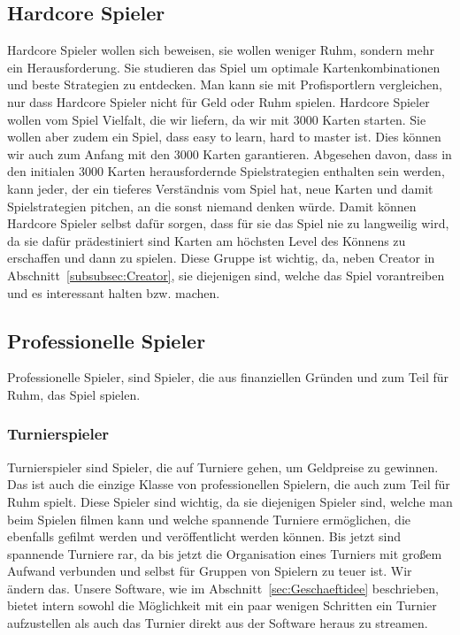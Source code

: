 \documentclass[fontsize=12, a4aper]{scrartcl}
\begin{document}
\subsection{Hardcore Spieler} \label{subsec:Hardcore_Spieler}

Hardcore Spieler wollen sich beweisen, sie wollen weniger Ruhm, sondern mehr ein Herausforderung. Sie studieren das Spiel um optimale Kartenkombinationen und beste Strategien zu entdecken. Man kann sie mit Profisportlern vergleichen, nur dass Hardcore Spieler nicht für Geld oder Ruhm spielen. Hardcore Spieler wollen vom Spiel Vielfalt, die wir liefern, da wir mit 3000 Karten starten. Sie wollen aber zudem ein Spiel, dass \glqq easy to learn, hard to master\grqq{} ist. Dies können wir auch zum Anfang mit den 3000 Karten garantieren. Abgesehen davon, dass in den initialen 3000 Karten herausfordernde Spielstrategien enthalten sein werden, kann jeder, der ein tieferes Verständnis vom Spiel hat, neue Karten und damit Spielstrategien pitchen, an die sonst niemand denken würde. Damit können Hardcore Spieler selbst dafür sorgen, dass für sie das Spiel nie zu langweilig wird, da sie dafür prädestiniert sind Karten am höchsten Level des Könnens zu erschaffen und dann zu spielen. Diese Gruppe ist wichtig, da, neben \glqq Creator\grqq{} in Abschnitt~\ref{subsubsec:Creator}, sie diejenigen sind, welche das Spiel vorantreiben und es interessant halten bzw. machen.

\subsection{Professionelle Spieler}

Professionelle Spieler, sind Spieler, die aus finanziellen Gründen und zum Teil für Ruhm, das Spiel spielen.

\subsubsection{Turnierspieler} \label{subsubsec:Professioneller_Spieler_Turnierspieler}

Turnierspieler sind Spieler, die auf Turniere gehen, um Geldpreise zu gewinnen. Das ist auch die einzige Klasse von professionellen Spielern, die auch zum Teil für Ruhm spielt. Diese Spieler sind wichtig, da sie diejenigen Spieler sind, welche man beim Spielen filmen kann und welche spannende Turniere ermöglichen, die ebenfalls gefilmt werden und veröffentlicht werden können. Bis jetzt sind spannende Turniere rar, da bis jetzt die Organisation eines Turniers mit großem Aufwand verbunden und selbst für Gruppen von Spielern zu teuer ist. Wir ändern das. Unsere Software, wie im Abschnitt~\ref{sec:Geschaeftidee} beschrieben, bietet intern sowohl die Möglichkeit mit ein paar wenigen Schritten ein Turnier aufzustellen als auch das Turnier direkt aus der Software heraus zu streamen.
\end{document}
